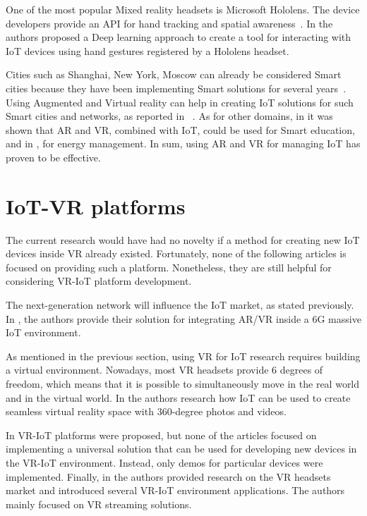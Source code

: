 One of the most popular Mixed reality headsets is Microsoft Hololens. The device developers provide an API for hand tracking and spatial awareness~\cite{MRTK2021}. In \cite{sun_magichand_2019} the authors proposed a Deep learning approach to create a tool for interacting with IoT devices using hand gestures registered by a Hololens headset. 

Cities such as Shanghai, New York, Moscow can already be considered Smart cities because they have been implementing Smart solutions for several years~\cite{vershinina_smart_2016}. Using Augmented and Virtual reality can help in creating IoT solutions for such Smart cities and networks, as reported in ~\cite{chakareski_uav-iot_2019, carneiro_bim_2018}. As for other domains, in \cite{paul_role_2019} it was shown that AR and VR, combined with IoT, could be used for Smart education, and in \cite{jang_building_2019-1}, for energy management. In sum, using AR and VR for managing IoT has proven to be effective.

\section{IoT-VR platforms}

The current research would have had no novelty if a method for creating new IoT devices inside VR already existed. Fortunately, none of the following articles is focused on providing such a platform. Nonetheless, they are still helpful for considering VR-IoT platform development.

The next-generation network will influence the IoT market, as stated previously. In \cite{liao_information-centric_2021}, the authors provide their solution for integrating AR/VR inside a 6G massive IoT environment.

As mentioned in the previous section, using VR for IoT research requires building a virtual environment. Nowadays, most VR headsets provide 6 degrees of freedom, which means that it is possible to simultaneously move in the real world and in the virtual world. In \cite{you_internet_2018} the authors research how IoT can be used to create seamless virtual reality space with 360-degree photos and videos.

In \cite{myeong-in_choi_design_2017, simiscuka_synchronisation_2018, simiscuka_real-virtual_2019, krishnan_performance_2020} VR-IoT platforms were proposed, but none of the articles focused on implementing a universal solution that can be used for developing new devices in the VR-IoT environment. Instead, only demos for particular devices were implemented. Finally, in \cite{hu_virtual_2021} the authors provided research on the VR headsets market and introduced several VR-IoT environment applications. The authors mainly focused on VR streaming solutions.

